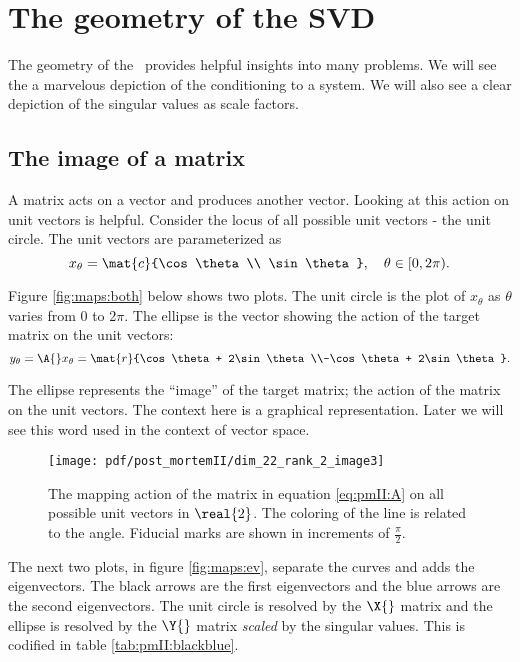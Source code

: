 \section{The geometry of the SVD}
The geometry of the \svdl \ provides helpful insights into many problems. We will see the a marvelous depiction of the conditioning to a system. We will also see a clear depiction of the singular values as scale factors.

\subsection{The image of a matrix}
A matrix acts on a vector and produces another vector. Looking at this action on unit vectors is helpful. Consider the locus of all possible unit vectors -  the unit circle. The unit vectors are parameterized as
\begin{equation}
  x_{\theta} = \mat{c}{\cos \theta \\ \sin \theta}, \quad \theta\in[0,2\pi).
\end{equation}

Figure \eqref{fig:maps:both} below shows two plots. The unit circle is the plot of $x_{\theta}$ as $\theta$ varies from 0 to 2$\pi$. The ellipse is the vector showing the action of the target matrix on the unit vectors:
\begin{equation}
  y_{\theta} = \A{}x_{\theta} = \mat{r}{\cos \theta + 2\sin \theta\\-\cos \theta + 2\sin \theta}. 
\end{equation}

The ellipse represents the ``image'' of the target matrix; the action of the matrix on the unit vectors. The context here is a graphical representation. Later we will see this word used in the context of vector space. 

\begin{figure}[htbp] %
   \centering
   \texttt{[image: pdf/post\_mortemII/dim\_22\_rank\_2\_image3]} 
   \caption[The mapping action of a matrix]{The mapping action of the matrix in equation \eqref{eq:pmII:A} on all possible unit vectors in $\real{2}$. The coloring of the line is related to the angle. Fiducial marks are shown in increments of $\frac{\pi}{2}$.}
   \label{fig:maps:both}
\end{figure}

The next two plots, in figure \eqref{fig:maps:ev}, separate the curves and adds the eigenvectors. The black arrows are the first eigenvectors and the blue arrows are the second eigenvectors. The unit circle is resolved by the $\X{}$ matrix and the ellipse is resolved by the $\Y{}$ matrix \textit{scaled} by the singular values. This is codified in table \eqref{tab:pmII:blackblue}.


